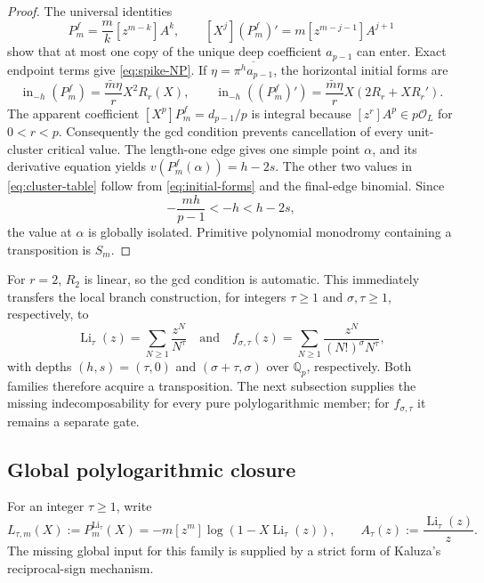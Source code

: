\documentclass[11pt]{article}
\theoremstyle{keio}
\theoremstyle{definition}
\theoremstyle{remark}
\newcommand{\Q}{\mathbb Q}
\begin{document}
\begin{proof}
The universal identities
\begin{equation}
[X^k]P_m^f=\frac mk[z^{m-k}]A^k,
\qquad
[X^j](P_m^f)'=m[z^{m-j-1}]A^{j+1}
\label{eq:faber-universal}
\end{equation}
show that at most one copy of the unique deep coefficient $a_{p-1}$ can
enter. Exact endpoint terms give \eqref{eq:spike-NP}. If
$\eta=\overline{\pi^ha_{p-1}}$, the horizontal initial forms are
\begin{equation}
\operatorname{in}_{-h}(P_m^f)
=\frac{\bar m\eta}{r}X^2R_r(X),
\qquad
\operatorname{in}_{-h}((P_m^f)')
=\frac{\bar m\eta}{r}X(2R_r+XR_r').
\label{eq:initial-forms}
\end{equation}
The apparent coefficient $[X^p]P_m^f=d_{p-1}/p$ is integral because
$[z^r]A^p\in p\mathcal O_L$ for $0<r<p$. Consequently the gcd condition
prevents cancellation of every unit-cluster critical value. The length-one
edge gives one simple point $\alpha$, and its derivative equation yields
$v(P_m^f(\alpha))=h-2s$. The other two values in
\eqref{eq:cluster-table} follow from \eqref{eq:initial-forms} and the
final-edge binomial. Since
\[
-\frac{mh}{p-1}<-h<h-2s,
\]
the value at $\alpha$ is globally isolated. Primitive polynomial monodromy
containing a transposition is $S_m$.
\end{proof}

For $r=2$, $R_2$ is linear, so the gcd condition is automatic. This
immediately transfers the local branch construction, for integers
$\tau\ge1$ and $\sigma,\tau\ge1$, respectively, to
\begin{equation}
\operatorname{Li}_\tau(z)=\sum_{N\ge1}\frac{z^N}{N^\tau}
\quad\text{and}\quad
f_{\sigma,\tau}(z)=\sum_{N\ge1}\frac{z^N}{(N!)^\sigma N^\tau},
\label{eq:transfer-families}
\end{equation}
with depths $(h,s)=(\tau,0)$ and $(\sigma+\tau,\sigma)$ over $\Q_p$,
respectively. Both families therefore acquire a transposition.  The next
subsection supplies the missing indecomposability for every pure
polylogarithmic member; for $f_{\sigma,\tau}$ it remains a separate gate.

\subsection{Global polylogarithmic closure}

For an integer $\tau\ge1$, write
\begin{equation}
L_{\tau,m}(X):=P_m^{\operatorname{Li}_\tau}(X)
=-m[z^m]\log\!\left(1-X\operatorname{Li}_\tau(z)\right),
\qquad
A_\tau(z):=\frac{\operatorname{Li}_\tau(z)}z.
\label{eq:polylog-faber}
\end{equation}
The missing global input for this family is supplied by a strict form of
Kaluza's reciprocal-sign mechanism.
\end{document}
